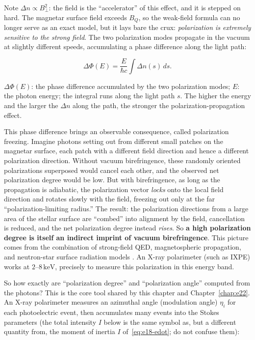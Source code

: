 Note \(\Delta n\propto B_\perp^2\): the field is the ``accelerator'' of this effect, and it is stepped on hard. The magnetar surface field exceeds \(B_Q\), so the weak-field formula can no longer serve as an exact model, but it lays bare the crux: \emph{polarization is extremely sensitive to the strong field}. The two polarization modes propagate in the vacuum at slightly different speeds, accumulating a phase difference along the light path:

\begin{equation}
  \Delta\Phi(E)=\frac{E}{\hbar c}\int\Delta n(s)\,ds .
  \label{eq:e18-dphi}
\end{equation}
\begin{formulaexplain}
\(\Delta\Phi(E)\): the phase difference accumulated by the two polarization modes; \(E\): the photon energy; the integral runs along the light path \(s\). The higher the energy and the larger the \(\Delta n\) along the path, the stronger the polarization-propagation effect.
\end{formulaexplain}

This phase difference brings an observable consequence, called polarization freezing. Imagine photons setting out from different small patches on the magnetar surface, each patch with a different field direction and hence a different polarization direction. Without vacuum birefringence, these randomly oriented polarizations superposed would cancel each other, and the observed net polarization degree would be low. But with birefringence, as long as the propagation is adiabatic, the polarization vector \emph{locks} onto the local field direction and rotates slowly with the field, freezing out only at the far ``polarization-limiting radius.'' The result: the polarization directions from a large area of the stellar surface are ``combed'' into alignment by the field, cancellation is reduced, and the net polarization degree instead \emph{rises}. So \textbf{a high polarization degree is itself an indirect imprint of vacuum birefringence}. This picture comes from the combination of strong-field QED, magnetospheric propagation, and neutron-star surface radiation models \citep{1936ZPhy...98..714H,1971AnPhy..67..599A,2000MNRAS.311..555H,2002PhRvD..66b3002H,2003MNRAS.342..134H}. An X-ray polarimeter (such as IXPE) works at \(2\)--\(8\,\mathrm{keV}\), precisely to measure this polarization in this energy band.

So how exactly are ``polarization degree'' and ``polarization angle'' computed from the photons? This is the core tool shared by this chapter and Chapter~\ref{chap:e22}. An X-ray polarimeter measures an azimuthal angle (modulation angle) \(\eta_i\) for each photoelectric event, then accumulates many events into the Stokes parameters (the total intensity \(I\) below is the same symbol as, but a different quantity from, the moment of inertia \(I\) of~\eqref{eq:e18-edot}; do not confuse them):

